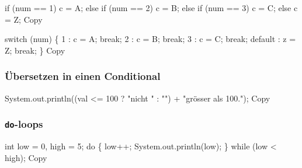 \documentclass[
]{article}
\newenvironment{Shaded}{}{}
\newcommand{\NormalTok}[1]{#1}
\begin{document}
\begin{Shaded}
\begin{Highlighting}[]
\NormalTok{if (num == 1)}
\NormalTok{    c = \textquotesingle{}A\textquotesingle{};}
\NormalTok{else}
\NormalTok{    if (num == 2)}
\NormalTok{        c = \textquotesingle{}B\textquotesingle{};}
\NormalTok{    else}
\NormalTok{        if (num == 3)}
\NormalTok{            c = \textquotesingle{}C\textquotesingle{};}
\NormalTok{        else}
\NormalTok{            c = \textquotesingle{}Z\textquotesingle{};}
\NormalTok{Copy}
\end{Highlighting}
\end{Shaded}

\begin{Shaded}
\begin{Highlighting}[]
\NormalTok{switch (num) \{}
\NormalTok{    1 : c = \textquotesingle{}A\textquotesingle{}; break;}
\NormalTok{    2 : c = \textquotesingle{}B\textquotesingle{}; break;}
\NormalTok{    3 : c = \textquotesingle{}C\textquotesingle{}; break;}
\NormalTok{    default : z = \textquotesingle{}Z\textquotesingle{}; break;}
\NormalTok{\}}
\NormalTok{Copy}
\end{Highlighting}
\end{Shaded}

\subsubsection{Übersetzen in einen
Conditional}\label{uxfcbersetzen-in-einen-conditional}

\begin{Shaded}
\begin{Highlighting}[]
\NormalTok{System.out.println((val \textless{}= 100 ? "nicht " : "") + "grösser als 100.");}
\NormalTok{Copy}
\end{Highlighting}
\end{Shaded}

\subsubsection{\texorpdfstring{\texttt{do}-loops}{do-loops}}\label{do-loops}

\begin{Shaded}
\begin{Highlighting}[]
\NormalTok{int low = 0, high = 5;}
\NormalTok{do \{}
\NormalTok{    low++;}
\NormalTok{    System.out.println(low);}
\NormalTok{\} while (low \textless{} high);}
\NormalTok{Copy}
\end{Highlighting}
\end{Shaded}
\end{document}
